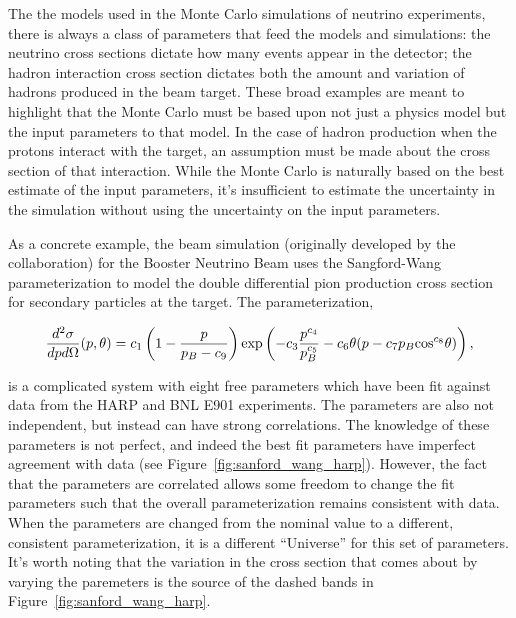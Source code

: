 The the models used in the Monte Carlo simulations of neutrino experiments, there is always a class of parameters that feed the models and simulations:  the neutrino cross sections dictate how many events appear in the detector; the hadron interaction cross section dictates both the amount and variation of hadrons produced in the beam target.  These broad examples are meant to highlight that the Monte Carlo must be based upon not just a physics model but the input parameters to that model.  In the case of hadron production when the protons interact with the target, an assumption must be made about the cross section of that interaction.  While the Monte Carlo is naturally based on the best estimate of the input parameters, it's insufficient to estimate the uncertainty in the simulation without using the uncertainty on the input parameters.

As a concrete example, the beam simulation (originally developed by the \MB collaboration) for the Booster Neutrino Beam uses the Sangford-Wang parameterization to model the double differential pion production cross section for secondary particles at the target.  The parameterization, 

\begin{equation}
\begin{centering}
\frac{d^2 \sigma}{dp d\Omega}(p,\theta) = c_1 \left(1 - \frac{p}{p_B - c_9}\right)\text{exp}\left(- c_3 \frac{p^{c_4}}{p^{c_5}_B} - c_6 \theta (p - c_7 p_B \text{cos}^{c_8}\theta) \right),
\end{centering}
\end{equation}

is a complicated system with eight free parameters which have been fit against data from the HARP and BNL E901 experiments.  The parameters are also not independent, but instead can have strong correlations.  The knowledge of these parameters is not perfect, and indeed the best fit parameters have imperfect agreement with data (see Figure~\ref{fig:sanford_wang_harp}).  However, the fact that the parameters are correlated allows some freedom to change the fit parameters such that the overall parameterization remains consistent with data.  When the parameters are changed from the nominal value to a different, consistent parameterization, it is a different ``Universe'' for this set of parameters.  It's worth noting that the variation in the cross section that comes about by varying the paremeters is the source of the dashed bands in Figure~\ref{fig:sanford_wang_harp}.

